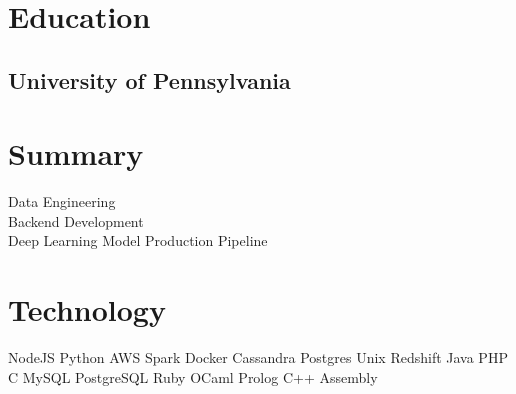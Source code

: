 \documentclass[]{deedy-resume-openfont}
\begin{document}
%
%



%
%

\begin{minipage}[t]{0.34\textwidth} 


\section{Education} 

\subsection{University of Pennsylvania}
\sectionsep



\section{Summary}

\textbullet{} Data Engineering \\\textbullet{} Backend Development \\\textbullet{} Deep Learning Model Production Pipeline

\sectionsep

\section{Technology}
NodeJS \textbullet{} Python \textbullet{} AWS \textbullet{} Spark \textbullet{} Docker Cassandra \textbullet{} Postgres \textbullet{} Unix \textbullet{} Redshift Java \textbullet{} PHP \textbullet{} C \textbullet{} MySQL \textbullet{} PostgreSQL Ruby \textbullet{} OCaml \textbullet{} Prolog \textbullet{} C++ \textbullet{} Assembly
\sectionsep



\end{minipage}
\end{document}
